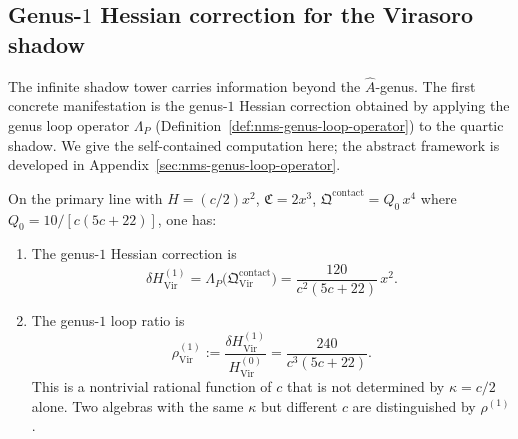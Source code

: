 \subsection{Genus-$1$ Hessian correction for the Virasoro shadow}
\label{subsec:w-virasoro-genus1-hessian}

The infinite shadow tower carries information beyond the
$\hat{A}$-genus.  The first concrete manifestation is the genus-$1$
Hessian correction obtained by applying the genus loop operator
$\Lambda_P$ (Definition~\ref{def:nms-genus-loop-operator}) to the
quartic shadow.  We give the self-contained computation here;
the abstract framework is developed in
Appendix~\ref{sec:nms-genus-loop-operator}.

\begin{theorem}
\label{thm:w-virasoro-genus1-hessian}
On the primary line with $H = (c/2)x^2$,
$\mathfrak C = 2x^3$,
$\mathfrak Q^{\mathrm{contact}} = Q_0\,x^4$ where
$Q_0 = 10/[c(5c+22)]$, one has:
\begin{enumerate}[label=\textup{(\roman*)}]
\item The genus-$1$ Hessian correction is
\begin{equation}
\label{eq:w-virasoro-genus1-hessian}
\delta H^{(1)}_{\mathrm{Vir}}
= \Lambda_P\bigl(\mathfrak Q^{\mathrm{contact}}_{\mathrm{Vir}}\bigr)
= \frac{120}{c^2(5c+22)}\,x^2.
\end{equation}

\item The genus-$1$ loop ratio is
\begin{equation}
\label{eq:w-virasoro-loop-ratio}
\rho^{(1)}_{\mathrm{Vir}}
:= \frac{\delta H^{(1)}_{\mathrm{Vir}}}{H^{(0)}_{\mathrm{Vir}}}
= \frac{240}{c^3(5c+22)}.
\end{equation}
This is a nontrivial rational function of $c$ that is not
determined by $\kappa = c/2$ alone.  Two algebras with the same
$\kappa$ but different $c$ are distinguished by
$\rho^{(1)}$.
\end{enumerate}
\end{theorem}

